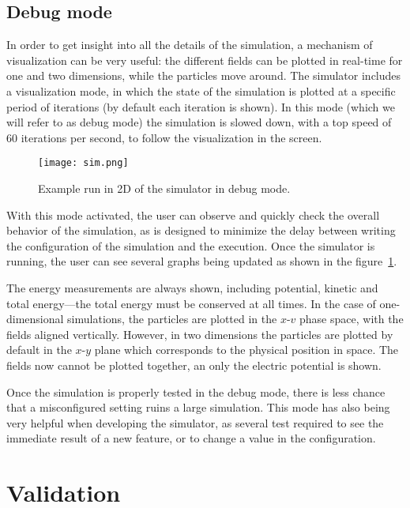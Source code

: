 \subsection{Debug mode}

In order to get insight into all the details of the simulation, a mechanism of 
visualization can be very useful: the different fields can be plotted in 
real-time for one and two dimensions, while the particles move around. The 
simulator includes a visualization mode, in which the state of the simulation is 
plotted at a specific period of iterations (by default each iteration is shown).  
In this mode (which we will refer to as debug mode) the simulation is slowed 
down, with a top speed of 60 iterations per second, to follow the visualization 
in the screen.


%
\begin{figure}[h]
	\centering
	\texttt{[image: sim.png]}
	\label{fig:debug-mode}
	\caption{Example run in 2D of the simulator in debug mode.}
\end{figure}

With this mode activated, the user can observe and quickly check the overall 
behavior of the simulation, as is designed to minimize the delay between writing 
the configuration of the simulation and the execution. Once the simulator is 
running, the user can see several graphs being updated as shown in the 
figure~\ref{fig:debug-mode}.

The energy measurements are always shown, including potential, kinetic and total 
energy---the total energy must be conserved at all times. In the case of 
one-dimensional simulations, the particles are plotted in the $x$-$v$ phase 
space, with the fields aligned vertically. However, in two dimensions the 
particles are plotted by default in the $x$-$y$ plane which corresponds to the 
physical position in space. The fields now cannot be plotted together, an only 
the electric potential is shown.

Once the simulation is properly tested in the debug mode, there is less chance 
that a misconfigured setting ruins a large simulation. This mode has also being 
very helpful when developing the simulator, as several test required to see the 
immediate result of a new feature, or to change a value in the configuration.

\section{Validation}

